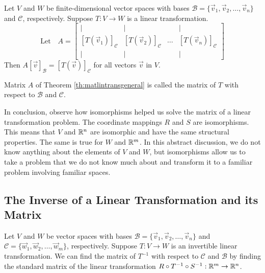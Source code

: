\documentclass{ximera}
\begin{document}
\begin{theorem}\label{th:matlintransgeneral}
Let $V$ and $W$ be finite-dimensional vector spaces with bases $\mathcal{B}=\{\vec{v}_1,\vec{v}_2,\ldots,\vec{v}_n\}$ and $\mathcal{C}$, respectively.  Suppose $T:V\rightarrow W$ is a linear transformation.  
$$\text{Let}\quad A=\begin{bmatrix}
           | & |& &|\\
		[T(\vec{v}_1)]_{\mathcal{C}} & [T(\vec{v}_2)]_{\mathcal{C}}&\dots &[T(\vec{v}_n)]_{\mathcal{C}}\\
		|&| & &|
         \end{bmatrix}$$
Then $A[\vec{v}]_{\mathcal{B}}=[T(\vec{v})]_{\mathcal{C}}$ for all vectors $\vec{v}$ in $V$.       
\end{theorem}

\begin{definition}\label{def:matlintransgenera}
Matrix $A$ of Theorem \ref{th:matlintransgeneral} is called the matrix of $T$ with respect to $\mathcal{B}$ and $\mathcal{C}$.
\end{definition}

In conclusion, observe how isomorphisms helped us solve the matrix of a linear transformation problem.  The coordinate mappings $R$ and $S$ are isomorphisms.  This means that $V$ and $\mathbb{R}^n$ are isomorphic and have the same structural properties.  The same is true for $W$ and $\mathbb{R}^m$.  In this abstract discussion, we do not know anything about the elements of $V$ and $W$, but isomorphisms allow us to take a problem that we do not know much about and transform it to a familiar problem involving familiar spaces.

\subsection*{The Inverse of a Linear Transformation and its Matrix}

Let $V$ and $W$ be vector spaces with bases $\mathcal{B}=\{\vec{v}_1, \vec{v}_2,\ldots ,\vec{v}_n\}$ and $\mathcal{C}=\{\vec{w}_1, \vec{w}_2,\ldots ,\vec{w}_m\}$, respectively.   Suppose $T:V\rightarrow W$ is an invertible linear transformation.  We can find the matrix of $T^{-1}$ with respect to $\mathcal{C}$ and $\mathcal{B}$ by finding the standard matrix of the linear transformation $R\circ T^{-1}\circ S^{-1}:\mathbb{R}^m\rightarrow \mathbb{R}^n$.

\begin{center}
\end{center}
\end{document}
